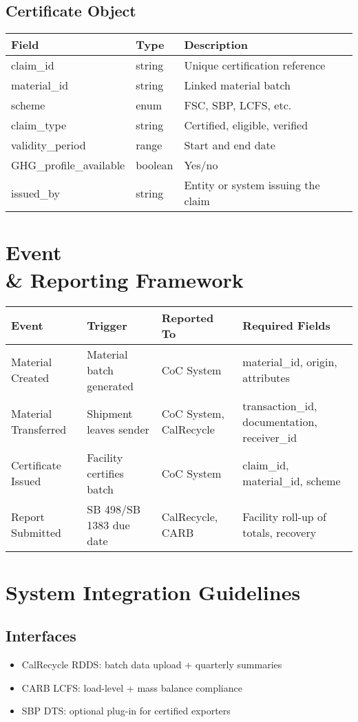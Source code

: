\documentclass{article}
\begin{document}
\subsection*{Certificate Object}
\begin{longtable}{|p{3cm}|p{3cm}|p{8cm}|}
\hline
\textbf{Field} & \textbf{Type} & \textbf{Description} \\
\hline
claim\_id & string & Unique certification reference \\
material\_id & string & Linked material batch \\
scheme & enum & FSC, SBP, LCFS, etc. \\
claim\_type & string & Certified, eligible, verified \\
validity\_period & range & Start and end date \\
GHG\_profile\_available & boolean & Yes/no \\
issued\_by & string & Entity or system issuing the claim \\
\hline
\end{longtable}

\section{Event \\& Reporting Framework}
\begin{longtable}{|p{4cm}|p{4cm}|p{4cm}|p{4cm}|}
\hline
\textbf{Event} & \textbf{Trigger} & \textbf{Reported To} & \textbf{Required Fields} \\
\hline
Material Created & Material batch generated & CoC System & material\_id, origin, attributes \\
Material Transferred & Shipment leaves sender & CoC System, CalRecycle & transaction\_id, documentation, receiver\_id \\
Certificate Issued & Facility certifies batch & CoC System & claim\_id, material\_id, scheme \\
Report Submitted & SB 498/SB 1383 due date & CalRecycle, CARB & Facility roll-up of totals, recovery \\
\hline
\end{longtable}

\section{System Integration Guidelines}
\subsection*{Interfaces}
\begin{itemize}[noitemsep]
    \item CalRecycle RDDS: batch data upload + quarterly summaries
    \item CARB LCFS: load-level + mass balance compliance
    \item SBP DTS: optional plug-in for certified exporters
\end{itemize}
\end{document}
